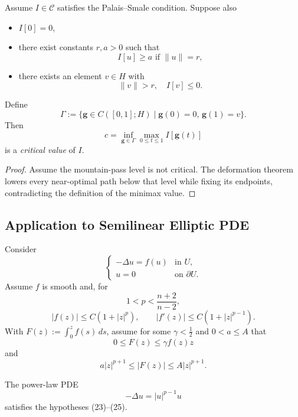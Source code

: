 \begin{theorem}
\label{thm:mountain-pass-theorem}

Assume $I \in \mathcal{C}$ satisfies the Palais--Smale condition. Suppose also
\begin{itemize}
\item[(i)] $I[0] = 0$,
\item[(ii)] there exist constants $r, a > 0$ such that
\[
I[u] \geq a \text{ if } \|u\| = r,
\]
\item[(iii)] there exists an element $v \in H$ with
\[
\|v\| > r, \quad I[v] \leq 0.
\]
\end{itemize}
Define
\[
\Gamma := \{\mathbf{g} \in C([0,1]; H) \mid \mathbf{g}(0) = 0, \, \mathbf{g}(1) = v\}.
\]
Then
\[
c = \inf_{\mathbf{g} \in \Gamma} \max_{0 \le t \le 1} I[\mathbf{g}(t)]
\]
is a \textit{critical value} of $I$.
\end{theorem}

\begin{proof}
\sketch Assume the mountain-pass level is not critical. The deformation theorem lowers every near-optimal path below that level while fixing its endpoints, contradicting the definition of the minimax value.
\end{proof}

\subsection{Application to Semilinear Elliptic PDE}
\label{sec:semilinear-elliptic-application}

Consider
\[
\begin{cases}
-\Delta u=f(u) & \text{in }U,\\
u=0 & \text{on }\partial U.
\end{cases}
\tag{22}
\]
Assume $f$ is smooth and, for
\[
1<p<\frac{n+2}{n-2},
\]
\[
|f(z)|\leq C(1+|z|^p),
\qquad
|f'(z)|\leq C(1+|z|^{p-1}).
\tag{23}
\]
With $F(z):=\int_0^z f(s)\,ds$, assume for some $\gamma<\frac12$ and $0<a\leq A$ that
\[
0\leq F(z)\leq\gamma f(z)z
\tag{24}
\]
and
\[
a|z|^{p+1}\leq|F(z)|\leq A|z|^{p+1}.
\tag{25}
\]

\begin{remark}
\label{rem:power-nonlinearity-semilinear-example}
The power-law PDE
\[
-\Delta u = |u|^{p-1}u
\]
satisfies the hypotheses (23)--(25).
\end{remark}

